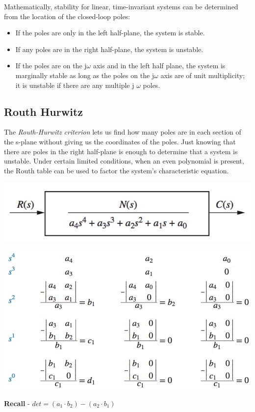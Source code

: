 \documentclass[11pt]{article}
\begin{document}
    Mathematically, stability for linear, time-invariant systems can be determined from the location of the closed-loop poles:

    \begin{itemize}
        \item{If the poles are only in the left half-plane, the system is stable.}
        \item{If any poles are in the right half-plane, the system is unstable.}
        \item{If the poles are on the j$\omega$ axis and in the left half plane, the system is marginally stable as long as the poles on the j$\omega$ axis are of unit multiplicity; it is unstable if there are any multiple j $\omega$ poles.}
    \end{itemize}
    

    \subsection{Routh Hurwitz}

    The \textit{Routh-Hurwitz criterion} lets us find how many poles are in each section of the s-plane without giving us the coordinates of the poles. Just knowing that there are poles in the right half-plane is enough to determine that a system is unstable. Under certain limited conditions, when an even polynomial is present, the Routh table can be used to factor the system’s characteristic equation.
    \begin{center}
        \includegraphics[width = 300 px]{img/routh-t}        
    \end{center}
    \begin{center}
        \includegraphics[width = 300 px]{img/routh}        
    \end{center}

    \begin{center}
        \textbf{Recall} - $det = (a_1 \cdot b_2) - (a_2 \cdot b_1)$
    \end{center}
\end{document}

